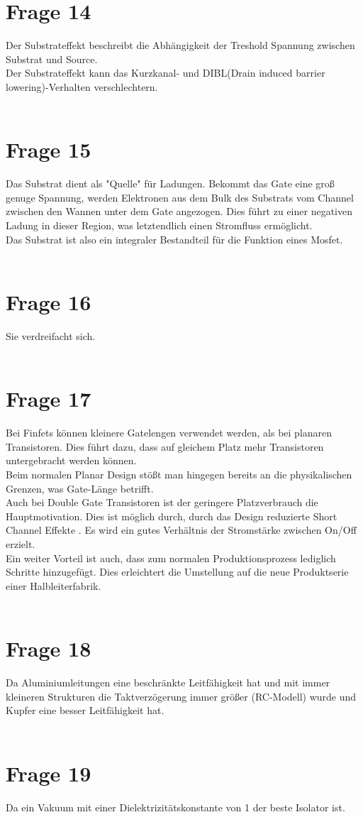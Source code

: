 \documentclass[a4paper]{scrartcl}
\begin{document}
\section*{Frage 14}
Der Substrateffekt beschreibt die Abhängigkeit der Treshold Spannung zwischen Substrat und Source.\\
Der Substrateffekt kann das Kurzkanal- und DIBL(Drain induced barrier lowering)-Verhalten verschlechtern.
~\\
~\\
\section*{Frage 15}
Das Substrat dient als "Quelle" für Ladungen. Bekommt das Gate eine groß genuge Spannung, werden Elektronen aus dem Bulk des Substrats vom Channel zwischen den Wannen unter dem Gate angezogen. Dies führt zu einer negativen Ladung in dieser Region, was letztendlich einen Stromfluss ermöglicht. \\
Das Substrat ist also ein integraler Bestandteil für die Funktion eines Mosfet.
~\\
~\\
\section*{Frage 16}
Sie verdreifacht sich.
~\\
~\\
\section*{Frage 17}
Bei Finfets können kleinere Gatelengen verwendet werden, als bei planaren Transistoren. Dies führt dazu, dass auf gleichem Platz mehr Transistoren untergebracht werden können.\\
Beim normalen Planar Design stößt man hingegen bereits an die physikalischen Grenzen, was Gate-Länge betrifft.\\
Auch bei Double Gate Transistoren ist der geringere Platzverbrauch die Hauptmotivation. Dies ist möglich durch, durch das Design reduzierte Short Channel Effekte . Es wird ein gutes Verhältnis der Stromstärke zwischen On/Off erzielt.\\
Ein weiter Vorteil ist auch, dass zum normalen Produktionsprozess lediglich Schritte hinzugefügt. Dies erleichtert die Umstellung auf die neue Produktserie einer Halbleiterfabrik.
~\\
~\\
\section*{Frage 18}
Da Aluminiumleitungen eine beschränkte Leitfähigkeit hat und mit immer kleineren Strukturen die Taktverzögerung immer größer (RC-Modell) wurde und Kupfer eine besser Leitfähigkeit hat.
~\\
~\\
\section*{Frage 19}
Da ein Vakuum mit einer Dielektrizitätskonstante von 1 der beste Isolator ist.
~\\
~\\
\end{document}
